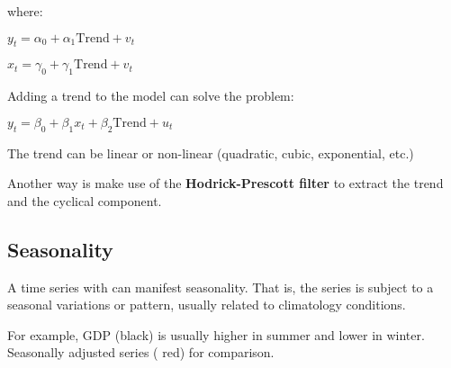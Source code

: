 \documentclass[10pt, a4paper, landscape]{article}
\begin{document}
\begin{multicols}{3}
		where:
		
		\begin{center}
			$y_{t} = \alpha_{0} + \alpha_{1} \mathrm{Trend} + v_{t}$
			
			$x_{t} = \gamma_{0} + \gamma_{1} \mathrm{Trend} + v_{t}$
		\end{center}
		
		Adding a trend to the model can solve the problem:
		
		\begin{center}
			$y_{t} = \beta_{0} + \beta_{1} x_{t} + \beta_{2} \mathrm{Trend} + u_{t}$
		\end{center}
		
		The trend can be linear or non-linear (quadratic, cubic, exponential, etc.)
		
		Another way is make use of the \textbf{Hodrick-Prescott filter} to extract the trend and the cyclical component.
		
		\subsection*{Seasonality}
		
		\setlength{\multicolsep}{0pt}
		\begin{multicols}{2}
			A time series with can manifest seasonality. That is, the series is subject to a seasonal variations or pattern, usually related to climatology conditions.
			
			For example, GDP (black) is usually higher in summer and lower in winter. Seasonally adjusted series ({\color{red} red}) for comparison.
			
			\columnbreak
			

\end{multicols}
\end{multicols}
\end{document}
